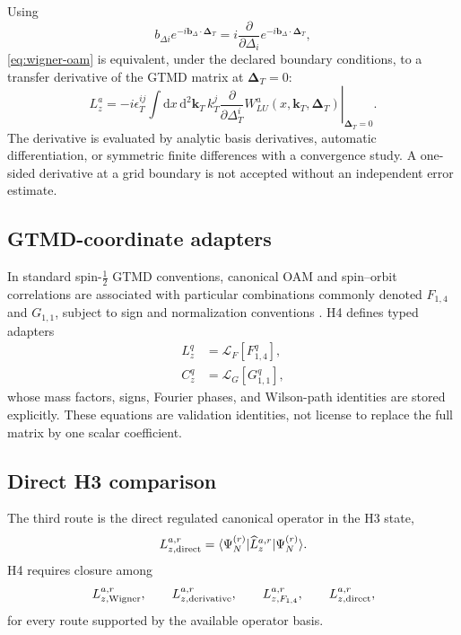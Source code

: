 \documentclass[11pt]{article}
\newcommand{\kT}{\bm{k}_{T}}
\newcommand{\DT}{\bm{\Delta}_{T}}
\newcommand{\bD}{\bm{b}_{\Delta}}
\newcommand{\dd}{\mathrm{d}}
\newcommand{\cL}{\mathcal L}
\begin{document}
Using
\begin{equation}
 b_{\Delta i}e^{-i\bD\cdot\DT}
 =i\frac{\partial}{\partial\Delta_i}
 e^{-i\bD\cdot\DT},
\end{equation}
\cref{eq:wigner-oam} is equivalent, under the declared boundary conditions,
to a transfer derivative of the GTMD matrix at \(\DT=0\):
\begin{equation}
 L_z^a
 =-i\epsilon_T^{ij}
 \int\dd x\,\dd^2\kT\,
 k_T^j
 \left.
 \frac{\partial}{\partial\Delta_T^i}
 W_{LU}^a(x,\kT,\DT)
 \right|_{\DT=0}.
 \label{eq:derivative-oam}
\end{equation}
The derivative is evaluated by analytic basis derivatives, automatic
differentiation, or symmetric finite differences with a convergence study.
A one-sided derivative at a grid boundary is not accepted without an
independent error estimate.

\subsection{GTMD-coordinate adapters}

In standard spin-\(\tfrac12\) GTMD conventions, canonical OAM and spin--orbit
correlations are associated with particular combinations commonly denoted
\(F_{1,4}\) and \(G_{1,1}\), subject to sign and normalization conventions
\cite{Kanazawa2014}.  H4 defines typed adapters
\begin{align}
 L_z^q&=\cL_F[F_{1,4}^q],\label{eq:f14-adapter}\\
 C_z^q&=\cL_G[G_{1,1}^q],
 \label{eq:g11-adapter}
\end{align}
whose mass factors, signs, Fourier phases, and Wilson-path identities are
stored explicitly.  These equations are validation identities, not license to
replace the full matrix by one scalar coefficient.

\subsection{Direct H3 comparison}

The third route is the direct regulated canonical operator in the H3 state,
\begin{equation}
 L_{z,\rm direct}^{a,r}
 =\langle\Psi_N^{(r)}|\widehat L_z^{a,r}|\Psi_N^{(r)}\rangle.
 \label{eq:direct-oam}
\end{equation}
H4 requires closure among
\begin{equation}
 L_{z,\rm Wigner}^{a,r},\qquad
 L_{z,\rm derivative}^{a,r},\qquad
 L_{z,F_{1,4}}^{a,r},\qquad
 L_{z,\rm direct}^{a,r},
 \label{eq:oam-four-routes}
\end{equation}
for every route supported by the available operator basis.
\end{document}
